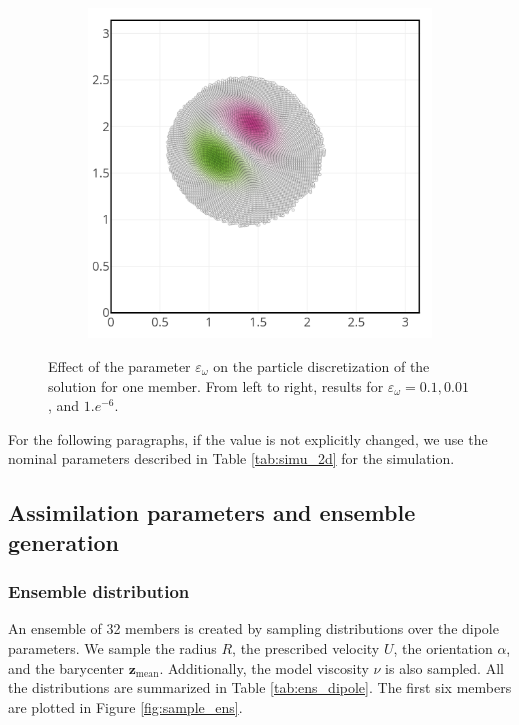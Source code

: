 \begin{figure}[htbp]
\begin{subfigure}{0.3\textwidth}
    \end{subfigure}
    \hfill
    \begin{subfigure}{0.3\textwidth}
        \includegraphics[width=\linewidth]{images/app2d/part_eps_1e-6.png}
    \end{subfigure}
    \caption{Effect of the parameter $\varepsilon_\omega$ on the particle discretization of the solution for one member. From left to right, results for $\varepsilon_\omega = 0.1, 0.01$, and $1.e^{-6}$.}
    \label{fig:eps_effect}
\end{figure}

For the following paragraphs, if the value is not explicitly changed, we use the nominal parameters described in Table \ref{tab:simu_2d} for the simulation.

\subsection{Assimilation parameters and ensemble generation}

\subsubsection{Ensemble distribution}
An ensemble of 32 members is created by sampling distributions over the dipole parameters. We sample the radius $R$, the prescribed velocity $U$, the orientation $\alpha$, and the barycenter $\bm z_{\text{mean}}$. Additionally, the model viscosity $\nu$ is also sampled. All the distributions are summarized in Table \ref{tab:ens_dipole}. The first six members are plotted in Figure \ref{fig:sample_ens}.

